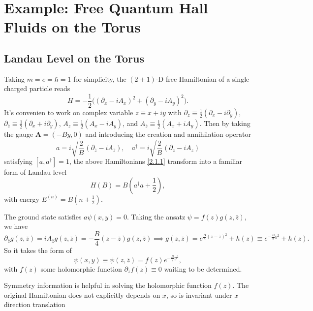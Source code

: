 \documentclass[10pt,nofootinbib,letterpaper]{revtex4}
\begin{document}
\section{Example: Free Quantum Hall Fluids on the Torus}
	\subsection{Landau Level on the Torus}
		Taking $m=e=\hbar=1$ for simplicity, the $(2+1)$-D free Hamiltonian of a single charged particle reads
		\begin{equation}\label{2.1.1}
			H=-\dfrac{1}{2}\bigg((\partial_x-iA_x)^2+(\partial_y-iA_y)^2\bigg).
		\end{equation}
		It's convenien to work on complex variable $z\equiv x+iy$ with $\partial_z\equiv\frac{1}{2}(\partial_x-i \partial_y)$, $\partial_{\bar{z}}\equiv\frac{1}{2}(\partial_x+i \partial_y)$, $A_z\equiv\frac{1}{2}(A_x-iA_y)$, and $A_{\bar{z}}\equiv\frac{1}{2}(A_x+iA_y)$. Then by taking the gauge $\bm{A}=(-By,0)$ and introducing the creation and annihilation operator
		\begin{equation*}
			a=i\sqrt{\dfrac{2}{B}}(\partial_{\bar{z}}-iA_{\bar{z}}),\quad a^\dagger=i\sqrt{\dfrac{2}{B}}(\partial_z-iA_z)
		\end{equation*}
		satisfying $[a,a^\dagger]=1$, the above Hamiltonians \eqref{2.1.1} transform into a familiar form of Landau level
		\begin{equation}\label{2.1.2}
			H(B)=B\left(a^\dagger a+\dfrac{1}{2}\right),
		\end{equation}
		with energy $E^{(n)}=B(n+\frac12)$.\par
		The ground state satisfies $a\psi(x,y)=0$. Taking the ansatz $\psi=f(z)g(z,\bar z)$, we have
		\begin{equation*}
			\partial_{\bar z}g(z,\bar z)=i A_{\bar z}g(z,\bar z)=-\dfrac{B}{4}(z-\bar z)g(z,\bar z)\implies g(z,\bar z)=e^{\frac B8(z-\bar z)^2}+h(z)\equiv e^{-\frac B2y^2}+h(z).
		\end{equation*}
		So it takes the form of
		\begin{equation}\label{2.1.3}
			\psi(x,y)\equiv\psi(z,\bar z)=f(z)e^{-\frac B2y^2},
		\end{equation}
		with $f(z)$ some holomorphic function $\partial_{\bar z}f(z)\equiv0$ waiting to be determined.\par
		Symmetry information is helpful in solving the holomorphic function $f(z)$. The original Hamiltonian does not explicitly depends on $x$, so is invariant under $x$-direction translation
\end{document}
